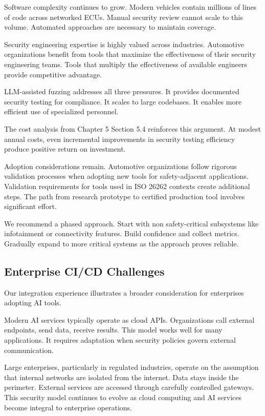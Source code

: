 Software complexity continues to grow. Modern vehicles contain millions of lines of code across networked ECUs. Manual security review cannot scale to this volume. Automated approaches are necessary to maintain coverage.

Security engineering expertise is highly valued across industries. Automotive organizations benefit from tools that maximize the effectiveness of their security engineering teams. Tools that multiply the effectiveness of available engineers provide competitive advantage.

LLM-assisted fuzzing addresses all three pressures. It provides documented security testing for compliance. It scales to large codebases. It enables more efficient use of specialized personnel.

The cost analysis from Chapter 5 Section 5.4 reinforces this argument. At modest annual costs, even incremental improvements in security testing efficiency produce positive return on investment.

Adoption considerations remain. Automotive organizations follow rigorous validation processes when adopting new tools for safety-adjacent applications. Validation requirements for tools used in ISO 26262 contexts create additional steps. The path from research prototype to certified production tool involves significant effort.

We recommend a phased approach. Start with non safety-critical subsystems like infotainment or connectivity features. Build confidence and collect metrics. Gradually expand to more critical systems as the approach proves reliable.


\subsection{Enterprise CI/CD Challenges}
\label{sec:discussion_enterprise_challenges}

Our integration experience illustrates a broader consideration for enterprises adopting AI tools.

Modern AI services typically operate as cloud APIs. Organizations call external endpoints, send data, receive results. This model works well for many applications. It requires adaptation when security policies govern external communication.

Large enterprises, particularly in regulated industries, operate on the assumption that internal networks are isolated from the internet. Data stays inside the perimeter. External services are accessed through carefully controlled gateways. This security model continues to evolve as cloud computing and AI services become integral to enterprise operations.

